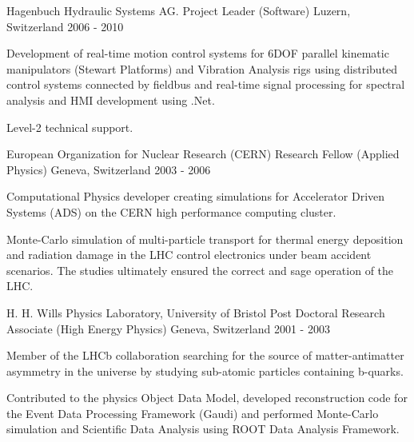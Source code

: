 \begin{cventries}
\cventry
{Hagenbuch Hydraulic Systems AG.} %
{Project Leader (Software)} %
{Luzern, Switzerland} %
{2006 - 2010} %
{
  \begin{cvitems} %
    \item {
        Development of real-time motion control systems for 6DOF parallel 
        kinematic manipulators (Stewart Platforms) and Vibration Analysis rigs
        using distributed control systems connected by fieldbus and real-time 
        signal processing for spectral analysis and HMI development using .Net.}
    \item {
        Level-2 technical support.}
  \end{cvitems}
}

\cventry
{European Organization for Nuclear Research (CERN)} %
{Research Fellow (Applied Physics)} %
{Geneva, Switzerland} %
{2003 - 2006} %
{
  \begin{cvitems} %
    \item {
        Computational Physics developer creating simulations for Accelerator 
        Driven Systems (ADS) on the CERN high performance computing cluster.}
    \item {
        Monte-Carlo simulation of multi-particle transport for thermal 
        energy deposition and radiation damage in the LHC control electronics under 
        beam accident scenarios. The studies ultimately ensured the correct  and 
        sage operation of the LHC.}
  \end{cvitems}
}

\cventry
{H. H. Wills Physics Laboratory, University of Bristol} %
{Post Doctoral Research Associate (High Energy Physics)} %
{Geneva, Switzerland} %
{2001 - 2003} %
{
  \begin{cvitems} %
    \item {
        Member of the LHCb collaboration searching for the source of matter-antimatter 
        asymmetry in the universe by studying sub-atomic particles containing b-quarks.}
    \item {
        Contributed to the physics Object Data Model, developed reconstruction code for 
        the Event Data Processing Framework (Gaudi) and performed Monte-Carlo simulation
        and Scientific Data Analysis using ROOT Data Analysis Framework.}
  \end{cvitems}
}


\end{cventries}

